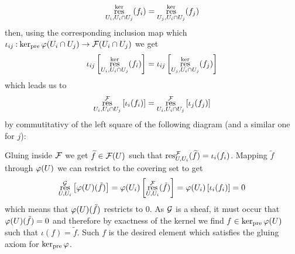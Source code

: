 \documentclass[12pt]{memoir}
\begin{document}
\begin{ptcbr}
\begin{enumerate}[i)]
        $$\operatorname*{res}^{\ker}_{U_i,U_i\cap U_j}(f_i)=\operatorname*{res}^{\ker}_{U_j,U_i\cap U_j}(f_j)$$
        then, using the corresponding inclusion map which $\iota_{ij}\mathbin{:}\ker_{\text{pre}}\varphi(U_i\cap U_j)\to\mathcal{F}(U_i\cap U_j )$ we get 
        $$\iota_{ij}\left\lbrack\operatorname*{res}^{\ker}_{U_i,U_i\cap U_j}(f_i)\right\rbrack=\iota_{ij}\left\lbrack\operatorname*{res}^{\ker}_{U_j,U_i\cap U_j}(f_j)\right\rbrack$$
        which leads us to 
        $$\operatorname*{res}^{\mathcal{F}}_{U_i,U_i\cap U_j}\left\lbrack\iota_i(f_i)\right\rbrack=\operatorname*{res}^{\mathcal{F}}_{U_i,U_i\cap U_j}\left\lbrack\iota_j(f_j)\right\rbrack$$
        by commutitativy of the left square of the following diagram (and a similar one for $j$):
        \begin{center}
        \end{center}
        Gluing inside $\mathcal{F}$ we get $\widetilde{f}\in\mathcal{F}(U)$ such that $\operatorname*{res}_{U,U_i}^{\mathcal{F}}(\widetilde{f})=\iota_i(f_i)$. Mapping $\tilde{f}$ through $\varphi(U)$ we can restrict to the covering set to get 
        $$\operatorname*{res}_{U,U_i}^{\mathcal{G}}\left\lbrack\varphi(U)(\tilde{f})\right\rbrack=\varphi(U_i)\left\lbrack\operatorname*{res}_{U,U_i}^{\mathcal{F}}(\tilde{f})\right\rbrack=\varphi(U_i)\left\lbrack\iota_i(f_i)\right\rbrack=0$$
        which means that $\varphi(U)(\tilde{f})$ restricts to 0. As $\mathcal{G}$ is a sheaf, it must occur that $\varphi(U)(\tilde{f})=0$ and therefore by exactness of the kernel we find $f\in\ker_{\text{pre}}\varphi(U)$ such that $\iota(f)=\tilde{f}$. Such $f$ is the desired element which satisfies the gluing axiom for $\ker_{\text{pre}}\varphi$.
    \end{enumerate}
\end{ptcbr}
\end{document}
